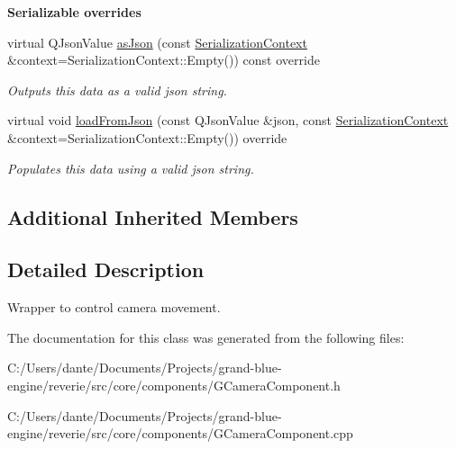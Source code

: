 \begin{Indent}\textbf{ Serializable overrides}\par
\begin{DoxyCompactItemize}
\item 
\mbox{\label{classrev_1_1_camera_controller_a937dce77826f5c7adc4e12d396103289}} 
virtual Q\+Json\+Value \mbox{\hyperlink{classrev_1_1_camera_controller_a937dce77826f5c7adc4e12d396103289}{as\+Json}} (const \mbox{\hyperlink{structrev_1_1_serialization_context}{Serialization\+Context}} \&context=Serialization\+Context\+::\+Empty()) const override
\begin{DoxyCompactList}\small\item\em Outputs this data as a valid json string. \end{DoxyCompactList}\item 
\mbox{\label{classrev_1_1_camera_controller_a021696f71e422c17d3cee2466c986427}} 
virtual void \mbox{\hyperlink{classrev_1_1_camera_controller_a021696f71e422c17d3cee2466c986427}{load\+From\+Json}} (const Q\+Json\+Value \&json, const \mbox{\hyperlink{structrev_1_1_serialization_context}{Serialization\+Context}} \&context=Serialization\+Context\+::\+Empty()) override
\begin{DoxyCompactList}\small\item\em Populates this data using a valid json string. \end{DoxyCompactList}\end{DoxyCompactItemize}
\end{Indent}
\subsection*{Additional Inherited Members}


\subsection{Detailed Description}
Wrapper to control camera movement. 

The documentation for this class was generated from the following files\+:\begin{DoxyCompactItemize}
\item 
C\+:/\+Users/dante/\+Documents/\+Projects/grand-\/blue-\/engine/reverie/src/core/components/G\+Camera\+Component.\+h\item 
C\+:/\+Users/dante/\+Documents/\+Projects/grand-\/blue-\/engine/reverie/src/core/components/G\+Camera\+Component.\+cpp\end{DoxyCompactItemize}
